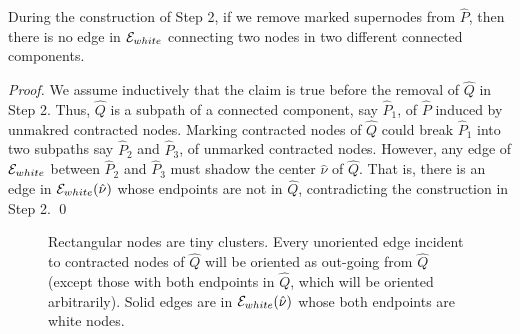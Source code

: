 \begin{claim}\label{clm:hatP-structure} During the construction of Step 2,  if  we remove marked supernodes from $\widehat{P}$, then there is no edge in $\mathcal{E}_{white}$ connecting two nodes in two different connected components. 
\end{claim}
\begin{proof} We assume inductively that the claim is true before the removal of  $\widehat{Q}$ in Step 2. Thus,   $\widehat{Q}$  is a subpath of a connected component, say $\widehat{P}_1$,  of $\widehat{P}$ induced by unmakred contracted nodes. Marking contracted nodes of $\widehat{Q}$  could break  $\widehat{P}_1$ into two subpaths say  $\widehat{P}_2$ and  $\widehat{P}_3$, of unmarked contracted nodes. However, any edge of $\mathcal{E}_{white}$ between $\widehat{P}_2$ and  $\widehat{P}_3$ must shadow the center $\hat{\nu}$ of $\widehat{Q}$. That is, there is an edge in $\mathcal{E}_{white}(\hat{\nu})$ whose endpoints are not in $\widehat{Q}$, contradicting the construction in Step 2. \qed
\end{proof}



\begin{figure}[htb]
	\caption{Rectangular nodes are tiny clusters. Every unoriented edge incident to contracted nodes of $\widehat{Q}$ will be oriented as out-going from $\widehat{Q}$ (except those with both endpoints in  $\widehat{Q}$, which will be oriented arbitrarily). Solid edges are in $\mathcal{E}_{white}(\hat{\nu})$ whose both endpoints are white nodes.}
	\label{fig:clustering-tiny}
\end{figure} 


